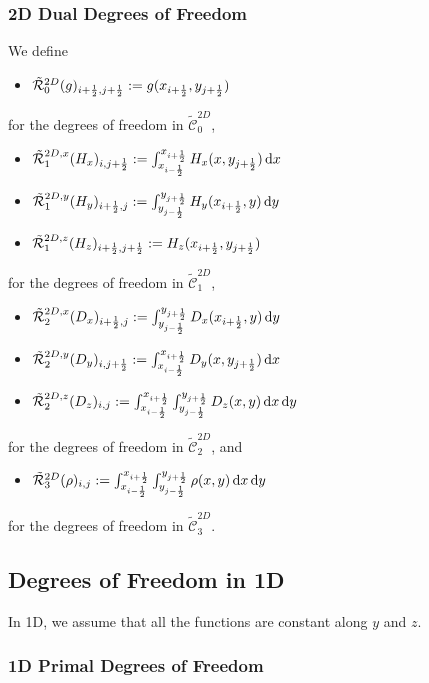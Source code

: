 \documentclass[11pt]{article}
\begin{document}
\subsubsection{2D Dual Degrees of Freedom}

We define
\begin{itemize}
    \item $\tilde{\mathcal{R}}^{2D}_0(g)_{{i+\frac12},{j+\frac12}} := g(x_{i+\frac12},y_{j+\frac12})$
\end{itemize}
for the degrees of freedom in $\tilde{\mathcal{C}}_0^{2D}$,
\begin{itemize}
    \item $\tilde{\mathcal{R}}^{2D,x}_1(H_x)_{i,{j+\frac12}} := \int_{x_{i-\frac12}}^{x_{{i+\frac12}}} H_x(x,y_{j+\frac12})\, {\rm d} x $
    \item $\tilde{\mathcal{R}}^{2D,y}_1(H_y)_{{i+\frac12},j} := \int_{y_{j-\frac12}}^{y_{{j+\frac12}}} H_y(x_{i+\frac12},y)\, {\rm d} y $
    \item $\tilde{\mathcal{R}}^{2D,z}_1(H_z)_{{i+\frac12},{j+\frac12}} := H_z(x_{i+\frac12},y_{j+\frac12}) $
\end{itemize}
for the degrees of freedom in $\tilde{\mathcal{C}}_1^{2D}$,
\begin{itemize}
    \item $\tilde{\mathcal{R}}^{2D,x}_2(D_x)_{{i+\frac12},j} := \int_{y_{j-\frac12}}^{y_{{j+\frac12}}} D_x(x_{i+\frac12},y)\, {\rm d} y  $
    \item $\tilde{\mathcal{R}}^{2D,y}_2(D_y)_{i,{j+\frac12}} := \int_{x_{i-\frac12}}^{x_{{i+\frac12}}} D_y(x,y_{j+\frac12})\, {\rm d} x  $
    \item $\tilde{\mathcal{R}}^{2D,z}_2(D_z)_{i,j} := \int_{x_{i-\frac12}}^{x_{{i+\frac12}}} \int_{y_{j-\frac12}}^{y_{{j+\frac12}}} D_z(x,y)\, {\rm d} x \, {\rm d} y $
\end{itemize}
for the degrees of freedom in $\tilde{\mathcal{C}}_2^{2D}$,
and
\begin{itemize}
	\item $\tilde{\mathcal{R}}^{2D}_3(\rho)_{i,j} := \int_{x_{i-\frac12}}^{x_{{i+\frac12}}} \int_{y_{j-\frac12}}^{y_{{j+\frac12}}} \rho(x,y)\, {\rm d} x \, {\rm d} y$
\end{itemize}
for the degrees of freedom in $\tilde{\mathcal{C}}_3^{2D}$.

\subsection{Degrees of Freedom in 1D}
\label{sec:dofs_1D}

In 1D, we assume that all the functions are constant along $y$ and $z$.

\subsubsection{1D Primal Degrees of Freedom}
\end{document}
